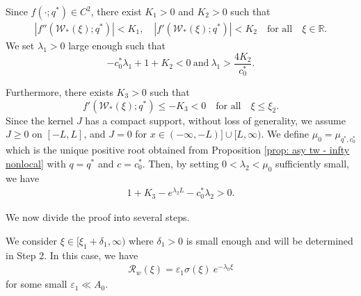 \documentclass[11pt,a4paper]{article}
\numberwithin{equation}{section}
\numberwithin{figure}{section}
\newcommand\bea{\begin{eqnarray}}
\newcommand\eea{\end{eqnarray}}
\newcommand\beaa{\begin{eqnarray*}}
\newcommand\eeaa{\end{eqnarray*}}
\begin{document}
Since $f(\cdot;q^*)\in C^2$, there exist $K_1>0$ and $K_2>0$ such that
\bea\label{K1K2 nonlocal}
|f''({\mathcal{W}}_*(\xi);q^*)|< K_1,\quad |f'({\mathcal{W}}_*(\xi);q^*)|< K_2\quad \mbox{for all}\quad\xi\in\mathbb{R}.
\eea
We set $\lambda_1>0$ %
large enough such that
\begin{equation}\label{condition on lambda 1 nonlocal}
-c_0^*\lambda_1+1+K_2<0\ \text{and}\ \lambda_1>\frac{4K_2}{c_0^*}.
\end{equation}

Furthermore, there exists $K_3>0$ such that
\begin{equation}\label{condition on xi_2 scalar nonlocal}
f'({\mathcal{W}}_*(\xi); q^*)\le -K_3<0\quad\text{for all}\quad\xi\le \xi_2.
\end{equation}
Since the kernel $J$ has a compact support, without loss of generality, we assume $J\ge0$ on $[-L,L]$, and $J=0$ for $x\in(-\infty,-L)]\cup[L,\infty)$.
We define $\mu_0=\mu_{q^*,c^*_0}$ which is the unique positive root obtained from Proposition \ref{prop: asy tw - infty nonlocal} with $q=q^*$ and $c=c^*_0$.
Then, by setting $0<\lambda_2<\mu_0$ sufficiently small, we have
\bea\label{lambda 2 nonlocal}
1+K_3-e^{\lambda_2L}-c_0^*\lambda_2>0.
\eea

We now divide the proof into several steps.

 We consider $\xi\in[\xi_1+\delta_1,\infty)$ where $\delta_1>0$ is small enough and will be determined in Step 2.
In this case, we have
\beaa
\mathcal{R}_w(\xi)=\varepsilon_1\sigma(\xi)\ e^{-\lambda_0\xi}
\eeaa
for some small $\varepsilon_1\ll A_0$.
\end{document}
